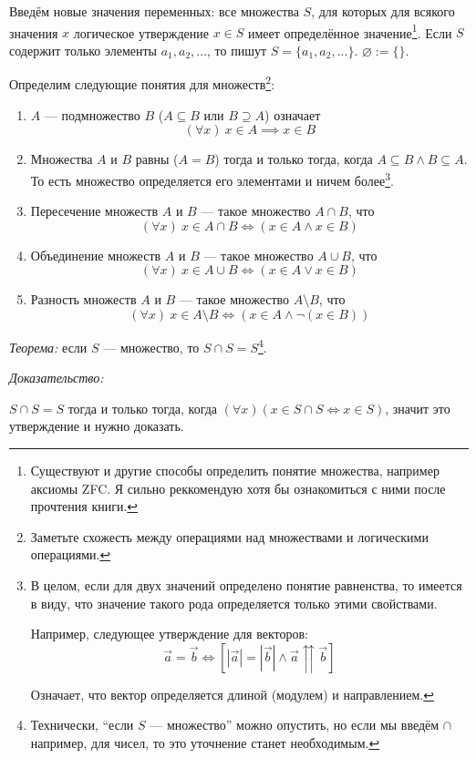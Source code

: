 Введём новые значения переменных: все множества $S$, для которых для
всякого значения $x$ логическое утверждение ${x\in S}$ имеет определённое
значение\footnote{Существуют и другие способы определить
	понятие множества, например аксиомы ZFC. Я сильно реккомендую
	хотя бы ознакомиться с ними после прочтения книги.}.
Если $S$ содержит только элементы $a_1,a_2,...$, то пишут $S=\{a_1,a_2,...\}$.
$\varnothing:=\{\}$.

Определим следующие понятия для множеств\footnote{Заметьте схожесть между операциями
	над множествами и логическими операциями.}:
\begin{enumerate}
	\item{}$A$ --- подмножество $B$ (${A\subseteq B}$ или $B\supseteq A$) означает
	\[
		(\forall x)~x\in A\implies x\in B
	\]

	\item{}Множества $A$ и $B$ равны ($A=B$) тогда и только тогда, когда
	$A\subseteq B\land B\subseteq A$.
	То есть множество определяется его элементами и ничем более\footnote{
		В целом, если для двух значений определено понятие равненства,
		то имеется в виду, что значение такого рода определяется только этими
		свойствами.

		Например, следующее утверждение для векторов:
		\[
			\vec{a}=\vec{b}\iff\left[|\vec{a}|=|\vec{b}|\land
				\vec{a}\upuparrows\vec{b}\right]
		\]

		Означает, что вектор определяется длиной (модулем) и направлением.
	}.

	\item{}Пересечение множеств $A$ и $B$ --- такое множество $A\cap B$, что
	\[
		(\forall x)~x\in A\cap B\iff(x\in A\land x\in B)
	\]

	\item{}Объединение множеств $A$ и $B$ --- такое множество $A\cup B$, что
	\[
		(\forall x)~x\in A\cup B\iff (x\in A\lor x\in B)
	\]

	\item{}Разность множеств $A$ и $B$ --- такое множество $A\setminus B$, что
	\[
		(\forall x)~x\in A\setminus B\iff (x\in A\land \lnot(x\in B))
	\]
\end{enumerate}

{\it Теорема:} если $S$ --- множество, то $S\cap S=S$\footnote{
	Технически, ``если $S$ --- множество'' можно опустить, но если
	мы введём $\cap$ например, для чисел, то это уточнение станет необходимым.
}.

{\it Доказательство:}

$S\cap S=S$ тогда и только
тогда, когда ${(\forall x)(x\in S\cap S\iff x\in S)}$,
значит это утверждение и нужно доказать.

